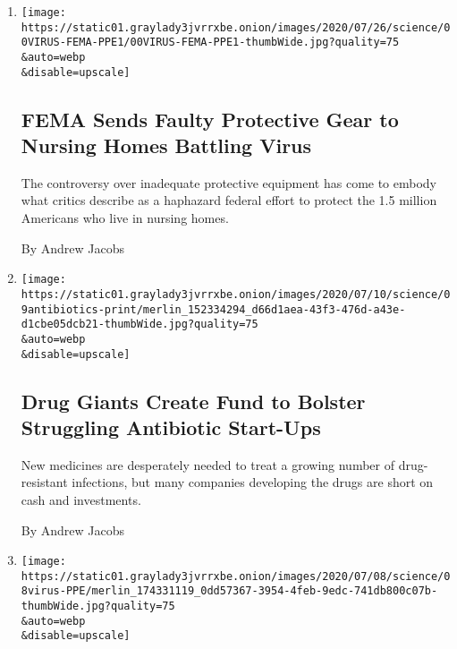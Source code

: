 \begin{enumerate}
\def\labelenumi{\arabic{enumi}.}
\item
  \href{/2020/07/24/health/coronavirus-nursing-homes-PPE.html}{}

  \texttt{[image: https://static01.graylady3jvrrxbe.onion/images/2020/07/26/science/00VIRUS-FEMA-PPE1/00VIRUS-FEMA-PPE1-thumbWide.jpg?quality=75\\\&auto=webp\\\&disable=upscale]}

  \hypertarget{fema-sends-faulty-protective-gear-to-nursing-homes-battling-virus}{%
  \subsection{FEMA Sends Faulty Protective Gear to Nursing Homes
  Battling
  Virus}\label{fema-sends-faulty-protective-gear-to-nursing-homes-battling-virus}}

  The controversy over inadequate protective equipment has come to
  embody what critics describe as a haphazard federal effort to protect
  the 1.5 million Americans who live in nursing homes.

  By Andrew Jacobs
\item
  \href{/2020/07/09/health/antibiotics-pharma-drug-resistance.html}{}

  \texttt{[image: https://static01.graylady3jvrrxbe.onion/images/2020/07/10/science/09antibiotics-print/merlin\_152334294\_d66d1aea-43f3-476d-a43e-d1cbe05dcb21-thumbWide.jpg?quality=75\\\&auto=webp\\\&disable=upscale]}

  \hypertarget{drug-giants-create-fund-to-bolster-struggling-antibiotic-start-ups}{%
  \subsection{Drug Giants Create Fund to Bolster Struggling Antibiotic
  Start-Ups}\label{drug-giants-create-fund-to-bolster-struggling-antibiotic-start-ups}}

  New medicines are desperately needed to treat a growing number of
  drug-resistant infections, but many companies developing the drugs are
  short on cash and investments.

  By Andrew Jacobs
\item
  \href{/2020/07/08/health/coronavirus-masks-ppe-doc.html}{}

  \texttt{[image: https://static01.graylady3jvrrxbe.onion/images/2020/07/08/science/08virus-PPE/merlin\_174331119\_0dd57367-3954-4feb-9edc-741db800c07b-thumbWide.jpg?quality=75\\\&auto=webp\\\&disable=upscale]}


\end{enumerate}
